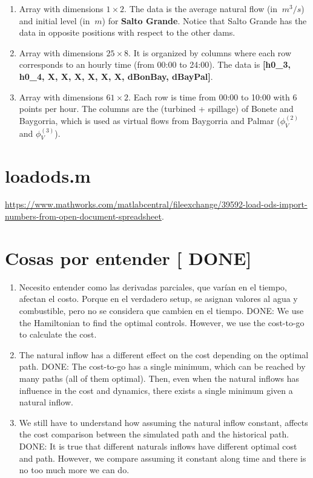 \documentclass[12pt]{article}
\theoremstyle{definition}
\theoremstyle{remark}
\begin{document}
\begin{enumerate}
\item Array with dimensions $1\times2$. The data is the average natural flow  (in $\SI{}{m^3/s}$) and initial level (in $\SI{}{m}$) for \textbf{Salto Grande}. {\color{red} Notice that Salto Grande has the data in opposite positions with respect to the other dams}.

\item Array with dimensions $25\times8$. It is organized by columns where each row corresponds to an hourly time (from 00:00 to 24:00). The data is \textbf{[h0\_3, h0\_4, {\color{red}X}, {\color{red}X}, {\color{red}X}, {\color{red}X}, {\color{red}X}, {\color{red}X}, dBonBay, dBayPal]}.

\item Array with dimensions $61\times2$. Each row is time from 00:00 to 10:00 with 6 points per hour. The columns are the (turbined + spillage) of Bonete and Baygorria, which is used as virtual flows from Baygorria and Palmar ($\phi_V^{(2)}$ and $\phi_V^{(3)}$).

\end{enumerate}

\section{loadods.m}

\url{https://www.mathworks.com/matlabcentral/fileexchange/39592-load-ods-import-numbers-from-open-document-spreadsheet}.

\section{Cosas por entender [{\color{green} DONE}]}

\begin{enumerate}

\item Necesito entender como las derivadas parciales, que var\'ian en el tiempo, afectan el costo. Porque en el verdadero setup, se asignan valores al agua y combustible, pero no se considera que cambien en el tiempo. {\color{green} DONE}: We use the Hamiltonian to find the optimal controls. However, we use the cost-to-go to calculate the cost.

\item The natural inflow has a different effect on the cost depending on the optimal path. {\color{green} DONE}: The cost-to-go has a single minimum, which can be reached by many paths (all of them optimal). Then, even when the natural inflows has influence in the cost and dynamics, there exists a single minimum given a natural inflow.

\item We still have to understand how assuming the natural inflow constant, affects the cost comparison between the simulated path and the historical path. {\color{green} DONE}: It is true that different naturals inflows have different optimal cost and path. However, we compare assuming it constant along time and there is no too much more we can do.

\end{enumerate}
\end{document}
